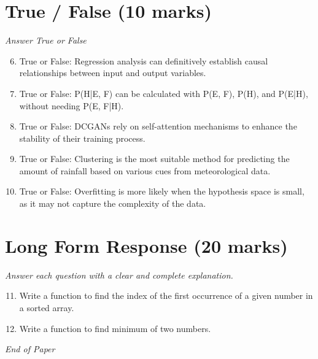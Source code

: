 \documentclass[12pt]{article}
\begin{document}
\section*{True / False (10 marks)}
\textit{Answer True or False}
\begin{enumerate}[label=\arabic*.]
\setcounter{enumi}{5}
\item True or False: Regression analysis can definitively establish causal relationships between input and output variables.
\item True or False: P(H|E, F) can be calculated with P(E, F), P(H), and P(E|H), without needing P(E, F|H).
\item True or False: DCGANs rely on self-attention mechanisms to enhance the stability of their training process.
\item True or False: Clustering is the most suitable method for predicting the amount of rainfall based on various cues from meteorological data.
\item True or False: Overfitting is more likely when the hypothesis space is small, as it may not capture the complexity of the data.
\end{enumerate}

\section*{Long Form Response (20 marks)}
\textit{Answer each question with a clear and complete explanation.}
\begin{enumerate}[label=\arabic*.]
\setcounter{enumi}{10}
\item Write a function to find the index of the first occurrence of a given number in a sorted array.
\item Write a function to find minimum of two numbers.
\end{enumerate}

\vfill
\noindent\textit{End of Paper}
\end{document}

